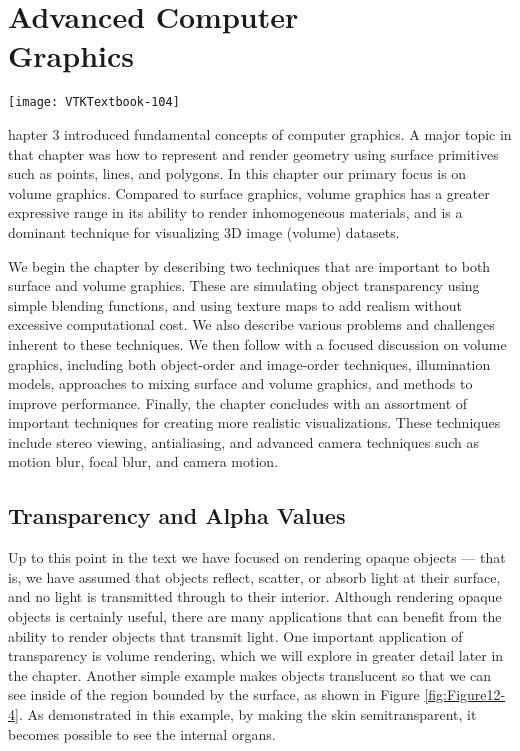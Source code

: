 \chapter[Advanced Computer Graphics]{Advanced Computer\\ Graphics}
\label{chap:advanced_computer_graphics}

\vspace{-9\baselineskip} %
\hfill
 \begin{minipage}{0.5\textwidth}
 \centering
 \texttt{[image: VTKTextbook-104]}
 \end{minipage}
\vspace{2\baselineskip}

hapter 3 introduced fundamental concepts of computer graphics.
A major topic in that chapter was how to represent and render geometry using surface primitives such as points, lines, and polygons.
In this chapter our primary focus is on volume graphics.
Compared to surface graphics, volume graphics has a greater expressive range in its ability to render inhomogeneous materials, and is a dominant technique for visualizing 3D image (volume) datasets.

We begin the chapter by describing two techniques that are important to both surface and volume graphics.
These are simulating object transparency using simple blending functions, and using texture maps to add realism without excessive computational cost.
We also describe various problems and challenges inherent to these techniques.
We then follow with a focused discussion on volume graphics, including both object-order and image-order techniques, illumination models, approaches to mixing surface and volume graphics, and methods to improve performance.
Finally, the chapter concludes with an assortment of important techniques for creating more realistic visualizations.
These techniques include stereo viewing, antialiasing, and advanced camera techniques such as motion blur, focal blur, and camera motion.

\section{Transparency and Alpha Values}
\label{sec:transparency_alpha}

Up to this point in the text we have focused on rendering opaque objects --- that is, we have assumed that objects reflect, scatter, or absorb light at their surface, and no light is transmitted through to their interior. Although rendering opaque objects is certainly useful, there are many applications that can benefit from the ability to render objects that transmit light. One important application of transparency is volume rendering, which we will explore in greater detail later in the chapter. Another simple example makes objects translucent so that we can see inside of the region bounded by the surface, as shown in Figure \ref{fig:Figure12-4}. As demonstrated in this example, by making the skin semitransparent, it becomes possible to see the internal organs.

